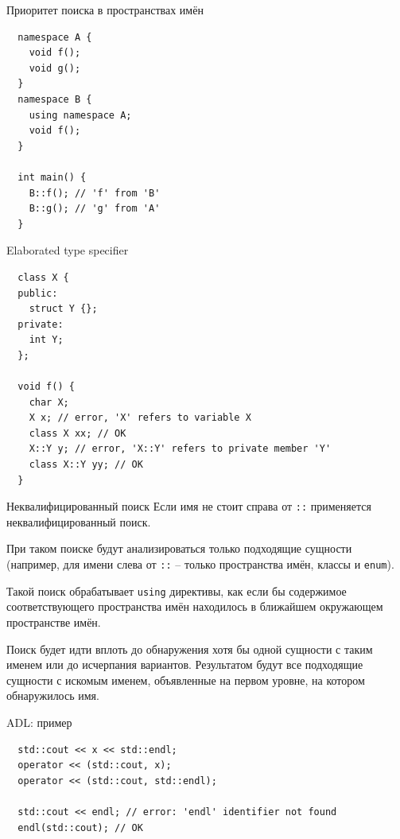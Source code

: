 \documentclass[unknownkeysallowed,xcolor=table]{beamer}
\begin{document}
\begin{frame}[fragile]{Приоритет поиска в пространствах имён}
  \begin{lstlisting}
  namespace A {
    void f();
    void g();
  }
  namespace B {
    using namespace A;
    void f();
  }

  int main() {
    B::f(); // 'f' from 'B'
    B::g(); // 'g' from 'A'
  }
  \end{lstlisting}
\end{frame}

\begin{frame}[fragile]{Elaborated type specifier}
  \begin{lstlisting}
  class X {
  public:
    struct Y {};
  private:
    int Y;
  };

  void f() {
    char X;
    X x; // error, 'X' refers to variable X
    class X xx; // OK
    X::Y y; // error, 'X::Y' refers to private member 'Y'
    class X::Y yy; // OK
  }
  \end{lstlisting}
\end{frame}

\begin{frame}{Неквалифицированный поиск}
  Если имя не стоит справа от \lstinline{::} применяется неквалифицированный поиск.

  \vspace{1em}

  При таком поиске будут анализироваться только подходящие сущности (например, для имени слева от \lstinline{::} -- только пространства имён, классы и \lstinline{enum}).

  \vspace{1em}

  Такой поиск обрабатывает \lstinline{using} директивы, как если бы содержимое соответствующего пространства имён находилось в ближайшем окружающем пространстве имён.

  \vspace{1em}

  Поиск будет идти вплоть до обнаружения хотя бы одной сущности с таким именем или до исчерпания вариантов. Результатом будут все подходящие сущности с искомым
  именем, объявленные на первом уровне, на котором обнаружилось имя.
\end{frame}

\begin{frame}[fragile]{ADL: пример}
  \begin{lstlisting}
  std::cout << x << std::endl;
  operator << (std::cout, x);
  operator << (std::cout, std::endl);

  std::cout << endl; // error: 'endl' identifier not found
  endl(std::cout); // OK
  \end{lstlisting}
\end{frame}
\end{document}
